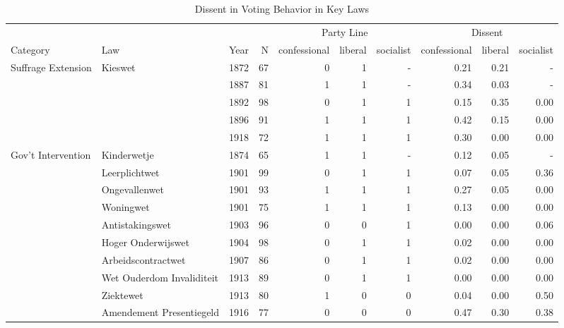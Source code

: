 \begin{table}

\caption{\label{tab:descriptivestats_dissent}Dissent in Voting Behavior in Key Laws}
\centering
\begin{tabular}[t]{lllrrrrrrr}
\toprule
\multicolumn{4}{c}{ } & \multicolumn{3}{c}{Party Line} & \multicolumn{3}{c}{Dissent} \\
\cmidrule(l{3pt}r{3pt}){5-7} \cmidrule(l{3pt}r{3pt}){8-10}
Category & Law & Year & N & confessional & liberal & socialist & confessional  & liberal  & socialist \\
\midrule
Suffrage Extension & Kieswet & 1872 & 67 & \num{0} & \num{1} & - & \num{0.21} & \num{0.21} & -\\
 &  & 1887 & 81 & \num{1} & \num{1} & - & \num{0.34} & \num{0.03} & -\\
 &  & 1892 & 98 & \num{0} & \num{1} & \num{1} & \num{0.15} & \num{0.35} & \num{0.00}\\
 &  & 1896 & 91 & \num{1} & \num{1} & \num{1} & \num{0.42} & \num{0.15} & \num{0.00}\\
 &  & 1918 & 72 & \num{1} & \num{1} & \num{1} & \num{0.30} & \num{0.00} & \num{0.00}\\
Gov't Intervention & Kinderwetje & 1874 & 65 & \num{1} & \num{1} & - & \num{0.12} & \num{0.05} & -\\
 & Leerplichtwet & 1901 & 99 & \num{0} & \num{1} & \num{1} & \num{0.07} & \num{0.05} & \num{0.36}\\
 & Ongevallenwet & 1901 & 93 & \num{1} & \num{1} & \num{1} & \num{0.27} & \num{0.05} & \num{0.00}\\
 & Woningwet & 1901 & 75 & \num{1} & \num{1} & \num{1} & \num{0.13} & \num{0.00} & \num{0.00}\\
 & Antistakingswet & 1903 & 96 & \num{0} & \num{0} & \num{1} & \num{0.00} & \num{0.00} & \num{0.06}\\
 & Hoger Onderwijswet & 1904 & 98 & \num{0} & \num{1} & \num{1} & \num{0.02} & \num{0.00} & \num{0.00}\\
 & Arbeidscontractwet & 1907 & 86 & \num{0} & \num{1} & \num{1} & \num{0.02} & \num{0.00} & \num{0.00}\\
 & Wet Ouderdom Invaliditeit & 1913 & 89 & \num{0} & \num{1} & \num{1} & \num{0.00} & \num{0.00} & \num{0.00}\\
 & Ziektewet & 1913 & 80 & \num{1} & \num{0} & \num{0} & \num{0.04} & \num{0.00} & \num{0.50}\\
 & Amendement Presentiegeld & 1916 & 77 & \num{0} & \num{0} & \num{0} & \num{0.47} & \num{0.30} & \num{0.38}\\

\end{tabular}
\end{table}

